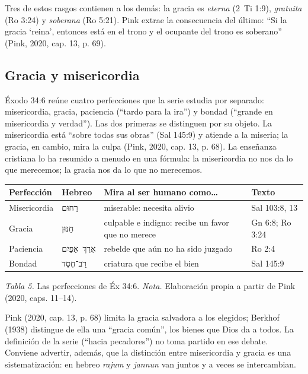 \documentclass[11pt,letterpaper]{article}
\newcommand{\heb}[1]{\mbox{\foreignlanguage{hebrew}{#1}}}
\begin{document}
Tres de estos rasgos contienen a los demás: la gracia es \emph{eterna} (2~Ti 1:9), \emph{gratuita} (Ro 3:24) y \emph{soberana} (Ro 5:21). Pink extrae la consecuencia del último: ``Si la gracia `reina', entonces está en el trono y el ocupante del trono es soberano'' (Pink, 2020, cap. 13, p. 69).

\subsection{Gracia y misericordia}
Éxodo 34:6 reúne cuatro perfecciones que la serie estudia por separado: misericordia, gracia, paciencia (``tardo para la ira'') y bondad (``grande en misericordia y verdad''). Las dos primeras se distinguen por su objeto. La misericordia está ``sobre todas sus obras'' (Sal 145:9) y atiende a la miseria; la gracia, en cambio, mira la culpa (Pink, 2020, cap. 13, p. 68). La enseñanza cristiana lo ha resumido a menudo en una fórmula: la misericordia no nos da lo que merecemos; la gracia nos da lo que no merecemos.

\begin{center}\small\renewcommand{\arraystretch}{1.2}
\begin{tabular}{@{}L{2.6cm}L{2.4cm}L{5.0cm}L{4.4cm}@{}}
\toprule
\textbf{Perfección} & \textbf{Hebreo} & \textbf{Mira al ser humano como\ldots} & \textbf{Texto} \\ \midrule
Misericordia & \heb{רַחוּם} & miserable: necesita alivio & Sal 103:8, 13 \\
Gracia & \heb{חַנּוּן} & culpable e indigno: recibe un favor que no merece & Gn 6:8; Ro 3:24 \\
Paciencia & \heb{אֶרֶךְ אַפַּיִם} & rebelde que aún no ha sido juzgado & Ro 2:4 \\
Bondad & \heb{רַב־חֶסֶד} & criatura que recibe el bien & Sal 145:9 \\
\bottomrule
\end{tabular}\par
{\footnotesize\color{gris}\textit{Tabla 5.} Las perfecciones de Éx 34:6. \textit{Nota.} Elaboración propia a partir de Pink (2020, caps. 11--14).}
\end{center}

\begin{nota}[Precisión]
Pink (2020, cap. 13, p. 68) limita la gracia salvadora a los elegidos; Berkhof (1938) distingue de ella una ``gracia común'', los bienes que Dios da a todos. La definición de la serie (``hacia pecadores'') no toma partido en ese debate. Conviene advertir, además, que la distinción entre misericordia y gracia es una sistematización: en hebreo \emph{rajum} y \emph{jannun} van juntos y a veces se intercambian.
\end{nota}
\end{document}
